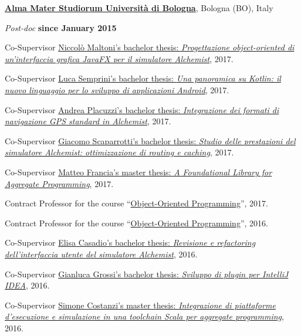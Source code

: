 \documentclass[10pt]{article}
\renewcommand{\section}[2]%
        {\pagebreak[3]\vspace{1.3\baselineskip}%
         \phantomsection\addcontentsline{toc}{section}{#1}%
         \hspace{0in}%
         \marginpar{
         \raggedright \scshape #1}#2}
\newenvironment{outerlist}[1][\enskip\textbullet]%
        {\begin{itemize}[#1]}{\end{itemize}%
         \vspace{-.6\baselineskip}}
\newenvironment{innerlist}[1][\enskip\textbullet]%
        {\begin{compactitem}[#1]}{\end{compactitem}}
\begin{document}
\section{Teaching}
\href{http://www.unibo.it/Portale/default.htm}{\textbf{Alma Mater Studiorum Università di Bologna}}, Bologna (BO), Italy
\begin{outerlist}
\item[] \textit{Post-doc} \hfill \textbf{since January 2015}
    \begin{innerlist}
      \item Co-Supervisor \href{http://amslaurea.unibo.it/14682/}{Niccolò Maltoni's bachelor thesis: \textit{Progettazione object-oriented di un'interfaccia grafica JavaFX per il simulatore Alchemist}}, 2017.
      \item Co-Supervisor \href{http://amslaurea.unibo.it/14673/}{Luca Semprini's bachelor thesis: \textit{Una panoramica su Kotlin: il nuovo linguaggio per lo sviluppo di applicazioni Android}}, 2017.
      \item Co-Supervisor \href{http://amslaurea.unibo.it/14329/}{Andrea Placuzzi's bachelor thesis: \textit{Integrazione dei formati di navigazione GPS standard in Alchemist}}, 2017.
      \item Co-Supervisor \href{http://amslaurea.unibo.it/14019/}{Giacomo Scaparrotti's bachelor thesis: \textit{Studio delle prestazioni del simulatore Alchemist: ottimizzazione di routing e caching}}, 2017.
      \item Co-Supervisor \href{http://amslaurea.unibo.it/13090/}{Matteo Francia's master thesis: \textit{A Foundational Library for Aggregate Programming}}, 2017.
      \item Contract Professor for the course ``\href{http://apice.unibo.it/xwiki/bin/view/Courses/OOP1718}{Object-Oriented Programming}'', 2017.
      \item Contract Professor for the course ``\href{http://apice.unibo.it/xwiki/bin/view/Courses/OOP1617}{Object-Oriented Programming}'', 2016.
      \item Co-Supervisor \href{http://amslaurea.unibo.it/12310/}{Elisa Casadio's bachelor thesis: \textit{Revisione e refactoring dell'interfaccia utente del simulatore Alchemist}}, 2016.
      \item Co-Supervisor \href{http://amslaurea.unibo.it/12503/}{Gianluca Grossi's bachelor thesis: \textit{Sviluppo di plugin per IntelliJ IDEA}}, 2016.
      \item Co-Supervisor \href{http://amslaurea.unibo.it/10519/}{Simone Costanzi's master thesis: \textit{Integrazione di piattaforme d'esecuzione e simulazione in una toolchain Scala per aggregate programming}}, 2016.

\end{innerlist}
\end{outerlist}
\end{document}
